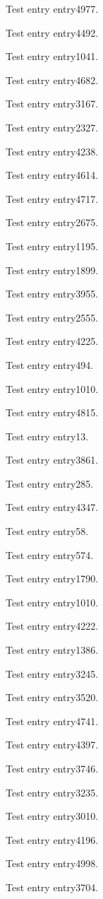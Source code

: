 Test entry \gls{entry4977}.

Test entry \gls{entry4492}.

Test entry \gls{entry1041}.

Test entry \gls{entry4682}.

Test entry \gls{entry3167}.

Test entry \gls{entry2327}.

Test entry \gls{entry4238}.

Test entry \gls{entry4614}.

Test entry \gls{entry4717}.

Test entry \gls{entry2675}.

Test entry \gls{entry1195}.

Test entry \gls{entry1899}.

Test entry \gls{entry3955}.

Test entry \gls{entry2555}.

Test entry \gls{entry4225}.

Test entry \gls{entry494}.

Test entry \gls{entry1010}.

Test entry \gls{entry4815}.

Test entry \gls{entry13}.

Test entry \gls{entry3861}.

Test entry \gls{entry285}.

Test entry \gls{entry4347}.

Test entry \gls{entry58}.

Test entry \gls{entry574}.

Test entry \gls{entry1790}.

Test entry \gls{entry1010}.

Test entry \gls{entry4222}.

Test entry \gls{entry1386}.

Test entry \gls{entry3245}.

Test entry \gls{entry3520}.

Test entry \gls{entry4741}.

Test entry \gls{entry4397}.

Test entry \gls{entry3746}.

Test entry \gls{entry3235}.

Test entry \gls{entry3010}.

Test entry \gls{entry4196}.

Test entry \gls{entry4998}.

Test entry \gls{entry3704}.

